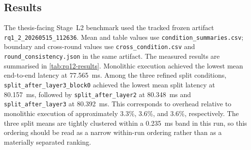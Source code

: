 \subsection{Results}
\label{sec:rq12-results}

The thesis-facing Stage~L2 benchmark used the tracked frozen artifact
\texttt{rq1\_2\_20260515\_112636}. Mean and table values use
\texttt{condition\_summaries.csv}; boundary and cross-round values use
\texttt{cross\_condition.csv} and \texttt{round\_consistency.json} in the
same artifact.
The measured results are summarised in \cref{tab:rq12-results}. Monolithic
execution achieved the lowest mean end-to-end latency at 77.565~ms. Among
the three refined split conditions, \texttt{split\_after\_layer3\_block0}
achieved the lowest mean split latency at 80.157~ms, followed by
\texttt{split\_after\_layer2} at 80.348~ms and \texttt{split\_after\_layer3}
at 80.392~ms. This corresponds to overhead relative to monolithic execution
of approximately 3.3\%, 3.6\%, and 3.6\%, respectively. The three split
means are tightly clustered within a 0.235~ms band in this run, so this
ordering should be read as a narrow within-run ordering rather than as a
materially separated ranking.

\begin{table}[t]
\centering
\caption[Stage~L2 latency, dispersion, overhead, and transfer summary]{Stage~L2 summary of mean latency, dispersion, descriptive within-run per-iteration 95\% confidence interval on the mean, overhead, and activation-transfer burden. Source files: \texttt{condition\_summaries.csv}, \texttt{cross\_condition.csv}, and \texttt{round\_consistency.json} in the frozen artifact \texttt{rq1\_2\_20260515\_112636}. Confidence intervals are reported from the \texttt{ci95\_lower\_ms} / \texttt{ci95\_upper\_ms} columns of \texttt{condition\_summaries.csv} and summarise per-iteration variation within this run.}
\label{tab:rq12-results}
\end{table}

